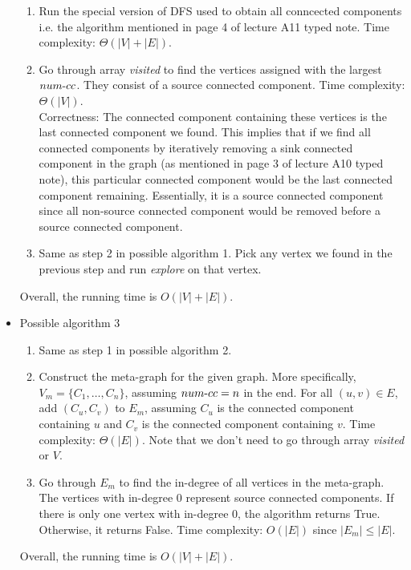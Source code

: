 \documentclass[11pt]{article}
\begin{document}
\begin{qunlist}
\begin{itemize}
\begin{enumerate}
        \item Run the special version of DFS used to obtain all conncected components i.e. the algorithm mentioned in page 4 of lecture A11 typed note. Time complexity: $\Theta(|V| + |E|)$.
        \item Go through array \emph{visited} to find the vertices assigned with the largest $num{\text -}cc$. They consist of a source connected component. Time complexity: $\Theta(|V|)$.\\
        Correctness: The connected component containing these vertices is the last connected component we found. This implies that if we find all connected components by iteratively removing a sink connected component in the graph (as mentioned in page 3 of lecture A10 typed note), this particular connected component would be the last connected component remaining. Essentially, it is a source connected component since all non-source connected component would be removed before a source connected component.
        \item Same as step 2 in possible algorithm 1. Pick any vertex we found in the previous step and run \emph{explore} on that vertex.
    \end{enumerate}
    Overall, the running time is $O(|V| + |E|)$.
    \item Possible algorithm 3
    \begin{enumerate}
        \item Same as step 1 in possible algorithm 2.
        \item Construct the meta-graph for the given graph. More specifically, $V_m = \{C_1, \dots, C_n\}$, assuming $num{\text -}cc = n$ in the end. For all $(u, v) \in E$, add $(C_u, C_v)$ to $E_m$, assuming $C_u$ is the connected component containing $u$ and $C_v$ is the connected component containing $v$. Time complexity: $\Theta(|E|)$. Note that we don't need to go through array \emph{visited} or $V$.
        \item Go through $E_m$ to find the in-degree of all vertices in the meta-graph. The vertices with in-degree 0 represent source connected components. If there is only one vertex with in-degree 0, the algorithm returns True. Otherwise, it returns False. Time complexity: $O(|E|)$ since $|E_m| \le |E|$.
    \end{enumerate}
    Overall, the running time is $O(|V| + |E|)$.
\end{itemize}



\end{qunlist}
\end{document}
